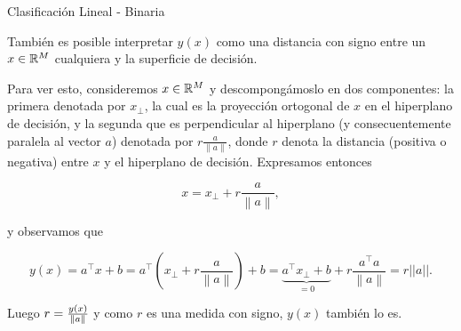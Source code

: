 \documentclass[9pt]{beamer}
\begin{document}
\begin{frame}{Clasificación Lineal - Binaria}

También es posible interpretar $y(x)$ como una distancia con signo entre un $x\in\mathbb{R}^M$ cualquiera y la superficie de decisión. \pause

Para ver esto, consideremos $x\in\mathbb{R}^M$ y descompongámoslo en dos componentes: la primera denotada por $x_{\bot}$, la cual es la proyección ortogonal de $x$ en el hiperplano de  decisión, y la segunda que es perpendicular al hiperplano (y consecuentemente paralela al vector $a$) denotada por $r\frac{a}{\left \| a \right \|}$, donde $r$ denota la distancia (positiva o negativa) entre $x$ y el  hiperplano de  decisión. Expresamos entonces  \pause

\begin{equation*}
  x = x_{\bot}+r\frac{a}{\left \| a \right \|},
\end{equation*}

y observamos que \pause

\begin{equation*}
  y(x) 
  = a^\top x+b 
  =a^\top  \left( x_{\bot} + r\frac{a}{\left \| a \right \|} \right) +b 
  = \underbrace{a^\top x_{\bot} +b }_{=0} +   r\frac{a^\top  a}{\left \| a \right \|}
  = r||a||.
\end{equation*}

\pause 

Luego $r = \frac{y(x)}{\left\lVert a\right\rVert}$ y como $r$ es una medida con signo, $y(x)$ también lo es. 


\end{frame}
\end{document}
